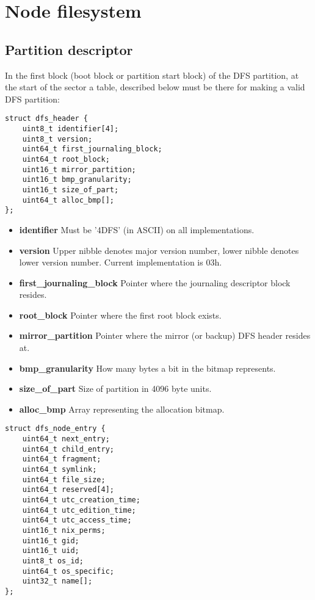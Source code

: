 \documentclass[12pt]{article}
\begin{document}
\section{Node filesystem}

\subsection{Partition descriptor}

In the first block (boot block or partition start block) of the DFS partition, at the start of the sector a table, described below must be there for making a valid DFS partition:

\begin{verbatim}
struct dfs_header {
	uint8_t identifier[4];
	uint8_t version;
	uint64_t first_journaling_block;
	uint64_t root_block;
	uint16_t mirror_partition;
	uint16_t bmp_granularity;
	uint16_t size_of_part;
	uint64_t alloc_bmp[];
};
\end{verbatim}

\begin{itemize}
	\item \textbf{identifier} Must be '4DFS' (in ASCII) on all implementations.
	\item \textbf{version} Upper nibble denotes major version number, lower nibble denotes lower version number. Current implementation is 03h.
	\item \textbf{first\_journaling\_block} Pointer where the journaling descriptor block resides.
	\item \textbf{root\_block} Pointer where the first root block exists.
	\item \textbf{mirror\_partition} Pointer where the mirror (or backup) DFS header resides at.
	\item \textbf{bmp\_granularity} How many bytes a bit in the bitmap represents.
	\item \textbf{size\_of\_part} Size of partition in 4096 byte units.
	\item \textbf{alloc\_bmp} Array representing the allocation bitmap.
\end{itemize}

\begin{verbatim}
struct dfs_node_entry {
	uint64_t next_entry;
	uint64_t child_entry;
	uint64_t fragment;
	uint64_t symlink;
	uint64_t file_size;
	uint64_t reserved[4];
	uint64_t utc_creation_time;
	uint64_t utc_edition_time;
	uint64_t utc_access_time;
	uint16_t nix_perms;
	uint16_t gid;
	uint16_t uid;
	uint8_t os_id;
	uint64_t os_specific;
	uint32_t name[];
};
\end{verbatim}
\end{document}
